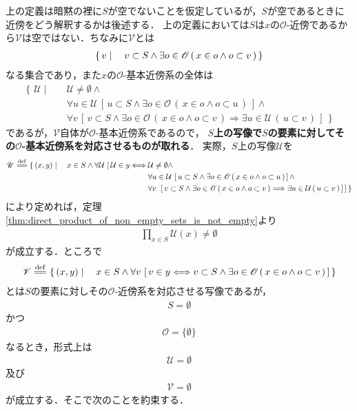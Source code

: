 	上の定義は暗黙の裡に$S$が空でないことを仮定しているが，$S$が空であるときに近傍をどう解釈するかは後述する．
	上の定義においては$S$は$x$の$\mathscr{O}$-近傍であるから$\mathcal{V}$は空ではない．ちなみに$\mathcal{V}$とは
	\begin{align}
		\left\{\, v \mid \quad v \subset S \wedge \exists o \in \mathscr{O}\, (\, x \in o \wedge o \subset v\, )\, \right\}
	\end{align}
	なる集合であり，また$x$の$\mathscr{O}$-基本近傍系の全体は
	\begin{align}
		\left\{\, \mathcal{U} \mid \quad \right.
		&\mathcal{U} \neq \emptyset \wedge \\
		&\forall u \in \mathcal{U}\, [\, u \subset S \wedge \exists o \in \mathscr{O}\, (\, x \in o \wedge o \subset u\, )\, ] \wedge \\
		&\forall v\, \left.\left[\, v \subset S \wedge \exists o \in \mathscr{O}\, (\, x \in o \wedge o \subset v\, )
		\Longrightarrow \exists u \in \mathcal{U}\, (\, u \subset v\, )\, \right]\, \right\}
	\end{align}
	であるが，$\mathcal{V}$自体が$\mathscr{O}$-基本近傍系であるので，
	{\bf $S$上の写像で$S$の要素に対してその$\mathscr{O}$-基本近傍系を対応させるものが取れる}．
	実際，$S$上の写像$\mathscr{U}$を
	\begin{align}
		\mathscr{U} \defeq \left\{\, (x,y) \mid \quad x \in S \wedge
		\forall \mathcal{U}\, \left[\, \mathcal{U} \in y \Longleftrightarrow \right.\right. 
		&\mathcal{U} \neq \emptyset \wedge \\
		&\forall u \in \mathcal{U}\, \left[\, u \subset S \wedge \exists o \in \mathscr{O}\, (\, x \in o \wedge o \subset u\, )\, \right] \wedge \\
		&\forall v\, \left.\left.\left[\, v \subset S \wedge \exists o \in \mathscr{O}\, (\, x \in o \wedge o \subset v\, )
		\Longrightarrow \exists u \in \mathcal{U}\, (\, u \subset v\, )\, \right]\, \right]\, \right\}
	\end{align}
	により定めれば，定理\ref{thm:direct_product_of_non_empty_sets_is_not_empty}より
	\begin{align}
		\prod_{x \in S} \mathscr{U}(x) \neq \emptyset
	\end{align}
	が成立する．ところで
	\begin{align}
		\mathscr{V} \defeq \left\{\, (x,y) \mid \quad x \in S \wedge
		\forall v\, \left[\, v \in y \Longleftrightarrow 
		v \subset S \wedge \exists o \in \mathscr{O}\, (\, x \in o \wedge o \subset v\, )\, \right]\, \right\}
	\end{align}
	とは$S$の要素に対しその$\mathscr{O}$-近傍系を対応させる写像であるが，
	\begin{align}
		S = \emptyset
	\end{align}	
	かつ
	\begin{align}
		\mathscr{O} = \{\emptyset\}
	\end{align}
	なるとき，形式上は
	\begin{align}
		\mathscr{U} = \emptyset
	\end{align}
	及び
	\begin{align}
		\mathscr{V} = \emptyset
	\end{align}
	が成立する．そこで次のことを約束する．
	
